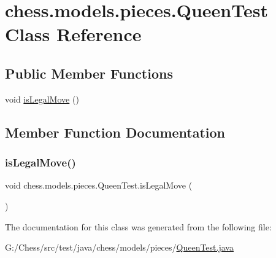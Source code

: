 \hypertarget{classchess_1_1models_1_1pieces_1_1_queen_test}{}\section{chess.\+models.\+pieces.\+Queen\+Test Class Reference}
\label{classchess_1_1models_1_1pieces_1_1_queen_test}
\subsection*{Public Member Functions}
\begin{DoxyCompactItemize}
\item 
void \mbox{\hyperlink{classchess_1_1models_1_1pieces_1_1_queen_test_a1881454d8fbe56b8c8f19895b048a81c}{is\+Legal\+Move}} ()
\end{DoxyCompactItemize}


\subsection{Member Function Documentation}
\mbox{\label{classchess_1_1models_1_1pieces_1_1_queen_test_a1881454d8fbe56b8c8f19895b048a81c}} 
\subsubsection{\texorpdfstring{is\+Legal\+Move()}{isLegalMove()}}
{\footnotesize\ttfamily void chess.\+models.\+pieces.\+Queen\+Test.\+is\+Legal\+Move (\begin{DoxyParamCaption}{ }\end{DoxyParamCaption})}



The documentation for this class was generated from the following file\+:\begin{DoxyCompactItemize}
\item 
G\+:/\+Chess/src/test/java/chess/models/pieces/\mbox{\hyperlink{_queen_test_8java}{Queen\+Test.\+java}}\end{DoxyCompactItemize}
